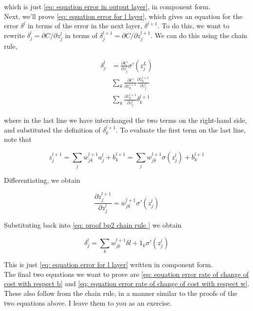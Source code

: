 which is just \ref{eq: equation error in output layer}, in component form.\\

Next, we'll prove \ref{eq: equation error for l layer}, which gives an equation for the error $\delta^l$ in terms of the error in the next layer, $\delta^{l+1}$. To do this, we want to rewrite $\delta^l_j=\partial C/\partial z^l_j$ in terms of $\delta^{l+1}_j=\partial C/\partial z^{l+1}_j$. We can do this using the chain rule,

\begin{equation}
\begin{aligned}
\delta^l_j&=\frac{\partial C}{\partial z^l_j}\sigma'(z^L_j)\\
&\sum_k\frac{\partial C}{\partial z^{l+1}_k}\frac{\partial z^{l+1}_k}{\partial z^l_j}\\
&\sum_k\frac{\partial z^{l+1}_k}{\partial z^l_j}\delta^{l+1}_k
\end{aligned}
\label{eq: proof bp2 chain rule }
\end{equation}

where in the last line we have interchanged the two terms on the right-hand side, and substituted the definition of $\delta^{l+1}_k$. To evaluate the first term on the last line, note that

\begin{equation}
z^{l+1}_j=\sum_jw^{l+1}_{jk}a^l_j+b^{l+1 }_k=\sum_jw^{l+1}_{jk}\sigma(z^l_j)+b^{l+1 }_k
\label{eq: proof bp2 z in layer l+1}
\end{equation}

Differentiating, we obtain

\begin{equation}
\frac{\partial z^{l+1}_j}{\partial z^l_j}=w^{l+1}_{jk}\sigma'(z^l_j)
\label{eq: proof bp2 derivative of z in layer l+1}
\end{equation}

Substituting back into \ref{eq: proof bp2 chain rule } we obtain

\begin{equation}
\delta^l_j=\sum_kw^{l+1}_{jk}\delta{l+1}_k\sigma'(z^l_j)
\label{eq: proof bp2 conclusion}
\end{equation}

This is just \ref{eq: equation error for l layer} written in component form.\\

The final two equations we want to prove are \ref{eq: equation error rate of change of cost with respect b} and \ref{eq: equation error rate of change of cost with respect w}. These also follow from the chain rule, in a manner similar to the proofs of the two equations above. I leave them to you as an exercise.


